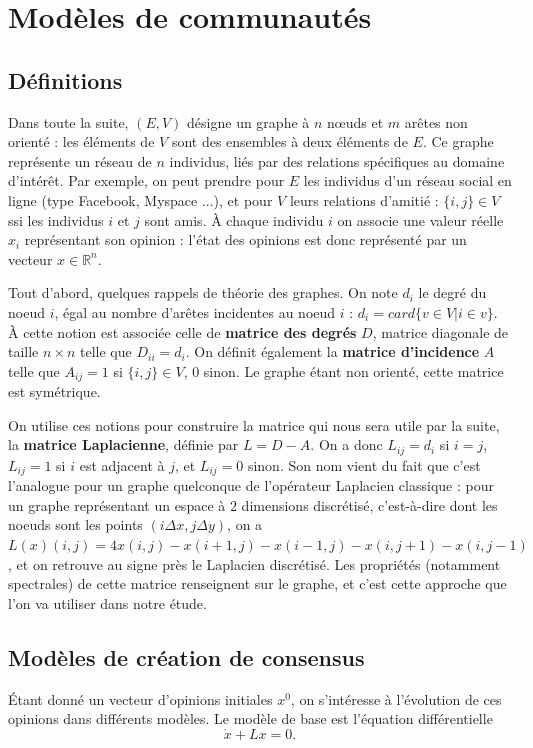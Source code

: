 \documentclass[12pt]{article}
\newcommand{\R}{\mathbb{R}}
\begin{document}
\section{Modèles de communautés}
\subsection{Définitions}
Dans toute la suite, $(E, V)$ désigne un graphe à $n$ n\oe uds et $m$
arêtes non orienté : les éléments de $V$ sont des ensembles à deux
éléments de $E$. Ce graphe représente un réseau de $n$ individus, liés
par des relations spécifiques au domaine d'intérêt. Par exemple, on
peut prendre pour $E$ les individus d'un réseau social en ligne (type
Facebook, Myspace ...), et pour $V$ leurs relations d'amitié : $\{i,
  j\} \in V$ ssi les individus $i$ et $j$ sont amis. À chaque individu
  $i$ on associe une valeur réelle $x_i$ représentant son opinion :
  l'état des opinions est donc représenté par un vecteur $x \in
  \R^n$.

  Tout d'abord, quelques rappels de théorie des graphes. On note $d_i$
  le degré du noeud $i$, égal au nombre d'arêtes incidentes au noeud
  $i$ : $d_i = card \{v \in V | i \in v\}$. À cette notion est
    associée celle de {\bf matrice des degrés} $D$, matrice diagonale
    de taille $n \times n$ telle que $D_{i i} = d_i$. On définit
    également la {\bf matrice d'incidence} $A$ telle que $A_{i j} = 1$
    si $\{i, j\} \in V$, $0$ sinon. Le graphe étant non orienté, cette
      matrice est symétrique.

      On utilise ces notions pour construire la matrice qui nous sera
      utile par la suite, la {\bf matrice Laplacienne}, définie par $L
      = D - A$. On a donc $L_{i j} = d_i$ si $i = j$, $L_{i j} = 1$ si
      $i$ est adjacent à $j$, et $L_{i j} = 0$ sinon. Son nom vient du
      fait que c'est l'analogue pour un graphe quelconque de
      l'opérateur Laplacien classique : pour un graphe représentant un
      espace à $2$ dimensions discrétisé, c'est-à-dire dont les noeuds
      sont les points $(i \Delta x, j \Delta y)$, on a $L(x) (i, j) =
      4 x(i, j) - x(i+1, j) - x(i-1, j) - x(i, j+1) - x(i, j-1)$, et
      on retrouve au signe près le Laplacien discrétisé. Les
      propriétés (notamment spectrales) de cette matrice renseignent
      sur le graphe, et c'est cette approche que l'on va utiliser dans
      notre étude.

      \subsection{Modèles de création de consensus}
      Étant donné un vecteur d'opinions initiales $x^0$, on
      s'intéresse à l'évolution de ces opinions dans différents
      modèles. Le modèle de base est l'équation différentielle
      \begin{equation}
        \label{eq_diff}
        \dot x + L x = 0.
      \end{equation}
\end{document}
